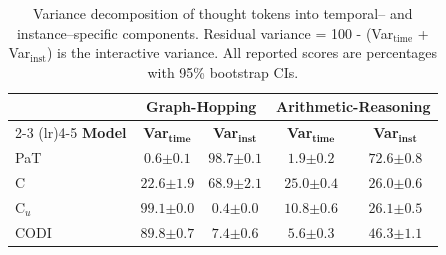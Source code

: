\begin{table}[!h]
\centering
\tiny
\setlength{\tabcolsep}{3pt}
\caption{Variance decomposition of thought tokens into temporal-- and instance--specific components. Residual variance = 100 - (Var$_\text{time}$ + Var$_\text{inst}$) is the interactive variance. All reported scores are percentages with 95\% bootstrap CIs.}
\label{tab:variance_decomposition}
\begin{tabular}{l cc | cc}
\toprule
& \multicolumn{2}{c}{\textbf{Graph-Hopping}} & \multicolumn{2}{c}{\textbf{Arithmetic-Reasoning}} \\
\cmidrule(lr){2-3} \cmidrule(lr){4-5}
\textbf{Model} & \textbf{Var}$_\textbf{time}$ & \textbf{Var}$_\textbf{inst}$ & \textbf{Var}$_\textbf{time}$ & \textbf{Var}$_\textbf{inst}$ \\
\midrule
PaT & $0.6 {\scriptstyle \pm 0.1}$ & $98.7 {\scriptstyle \pm 0.1}$ & $1.9 {\scriptstyle \pm 0.2}$ & $72.6 {\scriptstyle \pm 0.8}$ \\
\midrule
C & $22.6 {\scriptstyle \pm 1.9}$ & $68.9 {\scriptstyle \pm 2.1}$ & $25.0 {\scriptstyle \pm 0.4}$ & $26.0 {\scriptstyle \pm 0.6}$ \\
\midrule
C$_u$ & $99.1 {\scriptstyle \pm 0.0}$ & $0.4 {\scriptstyle \pm 0.0}$ & $10.8 {\scriptstyle \pm 0.6}$ & $26.1 {\scriptstyle \pm 0.5}$ \\
\midrule
CODI & $89.8 {\scriptstyle \pm 0.7}$ & $7.4 {\scriptstyle \pm 0.6}$ & $5.6 {\scriptstyle \pm 0.3}$ & $46.3 {\scriptstyle \pm 1.1}$ \\
\bottomrule
\end{tabular}
\end{table}
